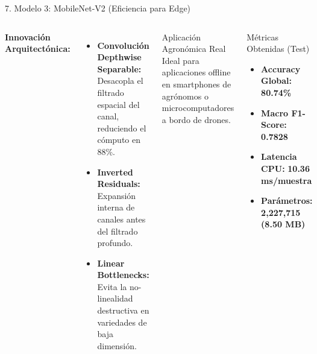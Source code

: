 \documentclass[aspectratio=169,10pt]{beamer}
\begin{document}
\begin{frame}{7. Modelo 3: MobileNet-V2 (Eficiencia para Edge)}
    \begin{columns}
        \textbf{Innovación Arquitectónica:}
        \begin{itemize}
            \item \textbf{Convolución Depthwise Separable:} Desacopla el filtrado espacial del canal, reduciendo el cómputo en 88\%.
            \item \textbf{Inverted Residuals:} Expansión interna de canales antes del filtrado profundo.
            \item \textbf{Linear Bottlenecks:} Evita la no-linealidad destructiva en variedades de baja dimensión.
        \end{itemize}

        \vspace{0.2cm}
        \begin{alertblock}{Aplicación Agronómica Real}
            Ideal para aplicaciones offline en smartphones de agrónomos o microcomputadores a bordo de drones.
        \end{alertblock}

        \centering
        \begin{block}{Métricas Obtenidas (Test)}
            \begin{itemize}
                \item \textbf{Accuracy Global:} \textbf{80.74\%}
                \item \textbf{Macro F1-Score:} \textbf{0.7828}
                \item \textbf{Latencia CPU:} \textbf{10.36 ms/muestra}
                \item \textbf{Parámetros:} \textbf{2,227,715 (8.50 MB)}
            \end{itemize}
        \end{block}
    \end{columns}
\end{frame}
\end{document}
